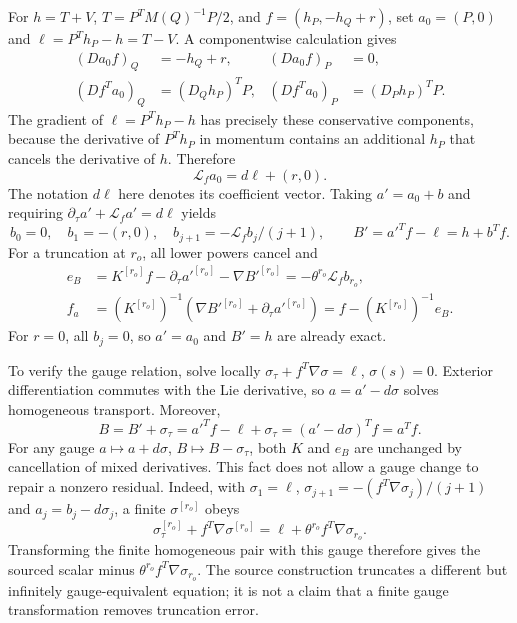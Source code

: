 For $h=T+V$, $T=P^TM(Q)^{-1}P/2$, and $f=(h_P,-h_Q+r)$, set $a_0=(P,0)$ and $\ell=P^Th_P-h=T-V$. A componentwise calculation gives
\begin{align}
 (Da_0 f)_Q&=-h_Q+r,&(Da_0 f)_P&=0,\\
 (Df^Ta_0)_Q&=(D_Qh_P)^TP,&(Df^Ta_0)_P&=(D_Ph_P)^TP.
\end{align}
The gradient of $\ell=P^Th_P-h$ has precisely these conservative components, because the derivative of $P^Th_P$ in momentum contains an additional $h_P$ that cancels the derivative of $h$. Therefore
\begin{equation}
 \mathcal L_fa_0=d\ell+(r,0).
 \label{eq:sup-source-identity}
\end{equation}
The notation $d\ell$ here denotes its coefficient vector. Taking $a'=a_0+b$ and requiring $\partial_\tau a'+\mathcal L_fa'=d\ell$ yields
\begin{equation}
 b_0=0,\quad b_1=-(r,0),\quad b_{j+1}=-\mathcal L_fb_j/(j+1),
 \qquad B'=a'^Tf-\ell=h+b^Tf.
 \label{eq:sup-source-series}
\end{equation}
For a truncation at $r_o$, all lower powers cancel and
\begin{align}
 e_B&=K^{[r_o]}f-\partial_\tau a'^{[r_o]}-\nabla B'^{[r_o]}
       =-\theta^{r_o}\mathcal L_fb_{r_o},\\
 f_a&=(K^{[r_o]})^{-1}(\nabla B'^{[r_o]}+\partial_\tau a'^{[r_o]})
       =f-(K^{[r_o]})^{-1}e_B.
 \label{eq:sup-source-remainder}
\end{align}
For $r=0$, all $b_j=0$, so $a'=a_0$ and $B'=h$ are already exact.

To verify the gauge relation, solve locally $\sigma_\tau+f^T\nabla\sigma=\ell$, $\sigma(s)=0$. Exterior differentiation commutes with the Lie derivative, so $a=a'-d\sigma$ solves homogeneous transport. Moreover,
\begin{equation}
 B=B'+\sigma_\tau=a'^Tf-\ell+\sigma_\tau
   =(a'-d\sigma)^Tf=a^Tf.
 \label{eq:sup-gauge-equivalence}
\end{equation}
For any gauge $a\mapsto a+d\sigma$, $B\mapsto B-\sigma_\tau$, both $K$ and $e_B$ are unchanged by cancellation of mixed derivatives. This fact does not allow a gauge change to repair a nonzero residual. Indeed, with $\sigma_1=\ell$, $\sigma_{j+1}=-(f^T\nabla\sigma_j)/(j+1)$ and $a_j=b_j-d\sigma_j$, a finite $\sigma^{[r_o]}$ obeys
\begin{equation}
 \sigma^{[r_o]}_\tau+f^T\nabla\sigma^{[r_o]}
 =\ell+\theta^{r_o}f^T\nabla\sigma_{r_o}.
 \label{eq:sup-gauge-last-term}
\end{equation}
Transforming the finite homogeneous pair with this gauge therefore gives the sourced scalar minus $\theta^{r_o}f^T\nabla\sigma_{r_o}$. The source construction truncates a different but infinitely gauge-equivalent equation; it is not a claim that a finite gauge transformation removes truncation error.

